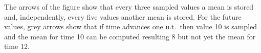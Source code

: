 The arrows of the figure show that every three sampled
values a mean is stored and, independently, every five values another
mean is stored. For the future values, grey arrows show  that if time
advances one u.t.\ then value 10 is sampled and the mean for
time 10 can be computed resulting 8 but not yet the mean for time 12.





